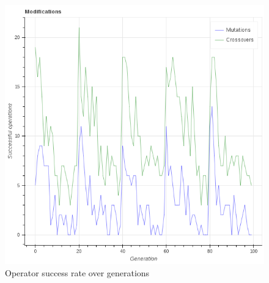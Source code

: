 \documentclass[10pt]{extarticle}
\begin{document}
\begin{figure}[H]
	\caption{Operator success rate over generations}
	\label{fig:operator1}
	\includegraphics[scale=0.3]{figures/operator1.png}
\end{figure}
\end{document}
